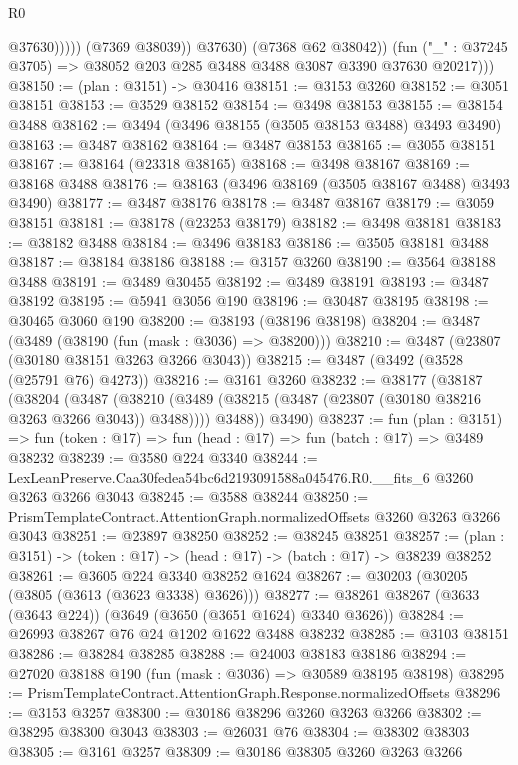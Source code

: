 \begin{lexlean}{R0}
\begin{coremodule}
                        @37630)))))
              (@7369 @38039))
            @37630)
          (@7368 @62 @38042))
        (fun ("_" : @37245 @3705) => @38052 @203 @285 @3488 @3488 @3087 @3390 @37630 @20217)))
@38150 := (plan : @3151) -> @30416
@38151 := @3153 @3260
@38152 := @3051 @38151
@38153 := @3529 @38152
@38154 := @3498 @38153
@38155 := @38154 @3488
@38162 := @3494 (@3496 @38155 (@3505 @38153 @3488) @3493 @3490)
@38163 := @3487 @38162
@38164 := @3487 @38153
@38165 := @3055 @38151
@38167 := @38164 (@23318 @38165)
@38168 := @3498 @38167
@38169 := @38168 @3488
@38176 := @38163 (@3496 @38169 (@3505 @38167 @3488) @3493 @3490)
@38177 := @3487 @38176
@38178 := @3487 @38167
@38179 := @3059 @38151
@38181 := @38178 (@23253 @38179)
@38182 := @3498 @38181
@38183 := @38182 @3488
@38184 := @3496 @38183
@38186 := @3505 @38181 @3488
@38187 := @38184 @38186
@38188 := @3157 @3260
@38190 := @3564 @38188 @3488
@38191 := @3489 @30455
@38192 := @3489 @38191
@38193 := @3487 @38192
@38195 := @5941 @3056 @190
@38196 := @30487 @38195
@38198 := @30465 @3060 @190
@38200 := @38193 (@38196 @38198)
@38204 := @3487 (@3489 (@38190 (fun (mask : @3036) => @38200)))
@38210 := @3487 (@23807 (@30180 @38151 @3263 @3266 @3043))
@38215 := @3487 (@3492 (@3528 (@25791 @76) @4273))
@38216 := @3161 @3260
@38232 := @38177
    (@38187
      (@38204
        (@3487
          (@38210 (@3489 (@38215 (@3487 (@23807 (@30180 @38216 @3263 @3266 @3043)) @3488))))
          @3488))
      @3490)
@38237 := fun (plan : @3151) =>
  fun (token : @17) => fun (head : @17) => fun (batch : @17) => @3489 @38232
@38239 := @3580 @224 @3340
@38244 := LexLeanPreserve.Caa30fedea54bc6d2193091588a045476.R0.__fits_6 @3260 @3263 @3266 @3043
@38245 := @3588 @38244
@38250 := PrismTemplateContract.AttentionGraph.normalizedOffsets @3260 @3263 @3266 @3043
@38251 := @23897 @38250
@38252 := @38245 @38251
@38257 := (plan : @3151) -> (token : @17) -> (head : @17) -> (batch : @17) -> @38239 @38252
@38261 := @3605 @224 @3340 @38252 @1624
@38267 := @30203 (@30205 (@3805 (@3613 (@3623 @3338) @3626)))
@38277 := @38261 @38267 (@3633 (@3643 @224)) (@3649 (@3650 (@3651 @1624) @3340 @3626))
@38284 := @26993 @38267 @76 @24 @1202 @1622 @3488 @38232
@38285 := @3103 @38151
@38286 := @38284 @38285
@38288 := @24003 @38183 @38186
@38294 := @27020 @38188 @190 (fun (mask : @3036) => @30589 @38195 @38198)
@38295 := PrismTemplateContract.AttentionGraph.Response.normalizedOffsets
@38296 := @3153 @3257
@38300 := @30186 @38296 @3260 @3263 @3266
@38302 := @38295 @38300 @3043
@38303 := @26031 @76
@38304 := @38302 @38303
@38305 := @3161 @3257
@38309 := @30186 @38305 @3260 @3263 @3266

\end{coremodule}
\end{lexlean}
